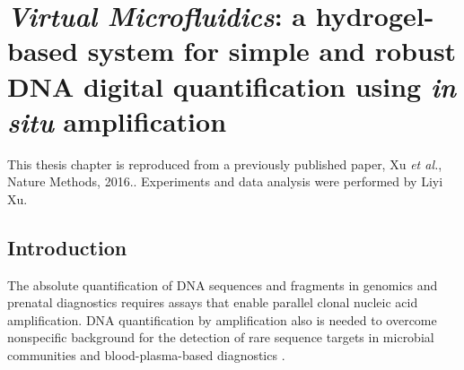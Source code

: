 \chapter{\textbf{\textit{Virtual Microfluidics}}: a hydrogel-based system for simple and robust DNA digital quantification using \textit{in situ} amplification}
This thesis chapter is reproduced from a previously published paper, Xu \textit{et al.}, Nature Methods, 2016.\cite{Xu:2016wt}. Experiments and data analysis were performed by Liyi Xu. 


\section{Introduction}

The absolute quantification of DNA sequences and fragments in genomics \cite{Blainey:2011dt} and prenatal diagnostics \cite{Lo:2007hb} requires assays that enable parallel clonal nucleic acid amplification. DNA quantification by amplification also is needed to overcome nonspecific background for the detection of rare sequence targets in microbial communities and blood-plasma-based diagnostics \cite{Huggett:2015hp,Gevensleben:2013kg,Kuypers:2017it,Johnson:2002wb}.


